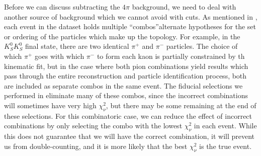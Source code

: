Before we can discuss subtracting the $4\pi$ background, we need to deal with another source of background which we cannot avoid with cuts. As mentioned in , each event in the dataset holds multiple ``combos''\textemdash alternate hypotheses for the set or ordering of the particles which make up the topology. For example, in the $K_S^0K_S^0$ final state, there are two identical $\pi^+$ and $\pi^-$ particles. The choice of which $\pi^+$ goes with which $\pi^-$ to form each kaon is partially constrained by th kinematic fit, but in the case where both pion combinations yield results which pass through the entire reconstruction and particle identification process, both are included as separate combos in the same event. The fiducial selections we performed in  eliminate many of these combos, since the incorrect combinations will sometimes have very high $\chi^2_\nu$, but there may be some remaining at the end of these selections. For this combinatoric case, we can reduce the effect of incorrect combinations by only selecting the combo with the lowest $\chi^2_\nu$ in each event. While this does not guarantee that we will have the correct combination, it will prevent us from double-counting, and it is more likely that the best $\chi^2_\nu$ is the true event.

